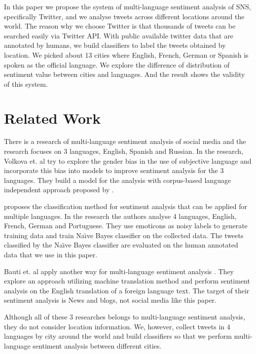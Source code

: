 \documentclass[twocolumn]{article}
\begin{document}
In this paper we propose the system of multi-language sentiment analysis of SNS, specifically Twitter, and we analyse tweets across different locations around the world.
The reason why we choose Twitter is that thousands of tweets can be searched easily via Twitter API.
With public available twitter data that are annotated by humans, we build classifiers to label the tweets obtained by location.
We picked about 13 cities where English, French, German or Spanish is spoken as the official language.
We explore the difference of distribution of sentiment value between cities and languages.
And the result shows the validity of this system.

\vspace{-6mm}

\section{Related Work}
\vspace{-2mm}
There is a research of multi-language sentiment analysis of social media \cite{related_work1} and the research focuses on 3 languages, English, Spanish and Russian.
In the research, Volkova et. al try to explore the gender bias in the use of subjective language and incorporate this bias into models to improve sentiment analysis for the 3 languages.
They build a model for the analysis with corpus-based language independent approach proposed by \cite{twitter_lexicon}.  

\cite{dataset} proposes the classification method for sentiment analysis that can be applied for multiple languages.
In the research the authors analyse 4 languages, English, French, German and Portuguese.
They use emoticons as noisy labels to generate training data and train Na\"\i ve Bayes classifier on the collected data.
The tweets classified by the Na\"\i ve Bayes classifier are evaluated on the human annotated data that we use in this paper.

Bauti et. al apply another way for multi-language sentiment analysis \cite{related_work3}.
They explore an approach utilizing machine translation method and perform sentiment analysis on the English translation of a foreign language text.
The target of their sentiment analysis is News and blogs, not social media like this paper.

Although all of these 3 researches belongs to multi-language sentiment analysis, they do not consider location information.
We, however, collect tweets in 4 languages by city around the world and build classifiers so that we perform multi-language sentiment analysis between different cities.
\end{document}
